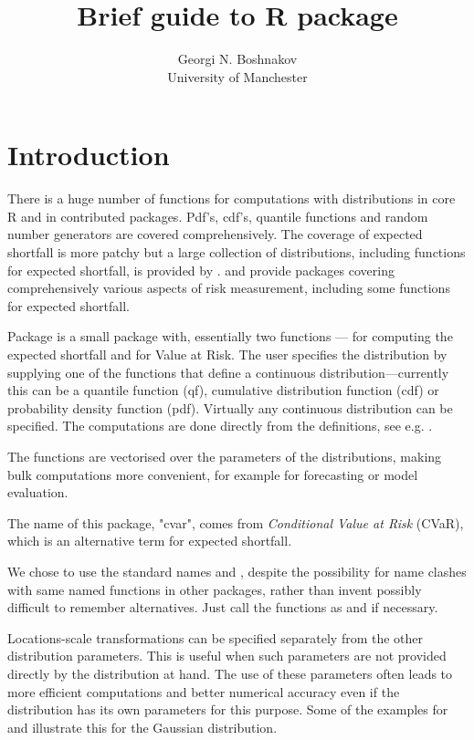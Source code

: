 \documentclass[nojss,article]{jss}
\title{Brief guide to R package \pkg{cvar}}
\author{Georgi N. Boshnakov \\ University of Manchester }
\begin{document}
\section{Introduction}
\label{sec:introduction}

There is a huge number of functions for computations with
distributions in core R and in contributed packages. Pdf's,
cdf's, quantile functions and random number generators are
covered comprehensively. The coverage of expected shortfall is
more patchy but a large collection of distributions, including
functions for expected shortfall, is provided by
\citet{VaRES2013}.
\citet{PerformanceAnalytics2018} and
\citet{actuarJSS2008} provide packages
covering comprehensively various aspects of risk measurement,
including some functions for expected shortfall.

Package  is a small package with, essentially two
functions ---  for computing the expected shortfall
and  for Value at Risk.  The user specifies the
distribution by supplying one of the functions that define a
continuous distribution---currently this can be a quantile
function (qf), cumulative distribution function (cdf) or
probability density function (pdf). Virtually any continuous
distribution can be specified.
The computations are done directly from the definitions, see e.g. 
\citet{acerbi2002expected}.

The functions are vectorised over the parameters of the
distributions, making bulk computations more convenient, for
example for forecasting or model evaluation.

The name of this package, "cvar", comes from \emph{Conditional
Value at Risk} (CVaR), which is an alternative term for
expected shortfall.

We chose to use the standard names  and ,
despite the possibility for name clashes with same named
functions in other packages, rather than invent possibly
difficult to remember alternatives. Just call the functions as
 and  if necessary.

Locations-scale transformations can be specified separately
from the other distribution parameters. This is useful when
such parameters are not provided directly by the distribution
at hand. The use of these parameters often leads to more
efficient computations and better numerical accuracy even if
the distribution has its own parameters for this purpose. Some
of the examples for  and  illustrate this
for the Gaussian distribution.
\end{document}
